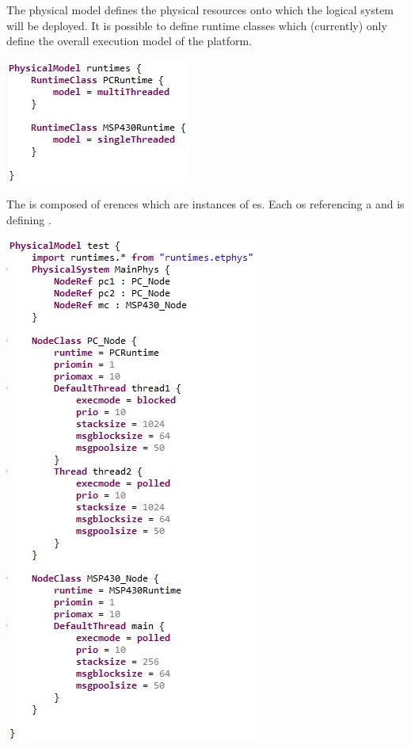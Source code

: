 The physical model defines the physical resources onto which the logical system will be deployed. It is 
possible to define runtime classes which (currently) only define the overall execution model of the 
platform.

\includegraphics{images/080-runtimes.jpg}

The  is composed of erences which are instances
of es. Each  os referencing a 
 and is defining .

\includegraphics{images/080-phys.jpg}

